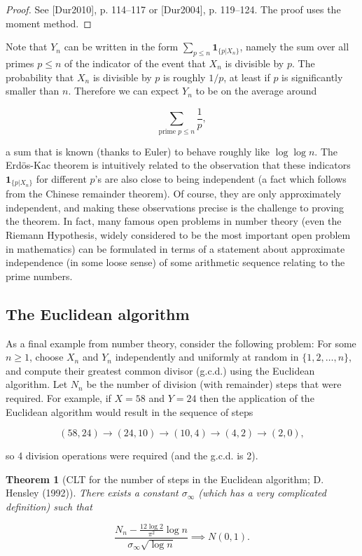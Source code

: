 \documentclass[11pt]{report}
\theoremstyle{plain}
\newtheorem{thm}{Theorem}[chapter]
\theoremstyle{definition}
\begin{document}
\begin{proof}
See [Dur2010], p. 114--117 or [Dur2004], p. 119--124.
The proof uses the moment method.
\end{proof}

\noindent Note that $Y_n$ can be written in the form
$\sum_{p\le n} \mathbf{1}_{\{p | X_n\}}$, namely the
sum over all primes $p\le n$ of the indicator of the
event that $X_n$ is divisible by $p$. The probability
that $X_n$ is divisible by $p$ is roughly $1/p$, at
least if $p$ is significantly smaller than $n$.
Therefore we can expect $Y_n$  to be on the average
around

\[
\sum_{\textrm{prime }p\le n} \frac{1}{p},
\]

\noindent a sum that is known (thanks to Euler) to behave
roughly like $\log\log n$. The Erdös-Kac theorem is
intuitively related to the observation that these
indicators $\mathbf{1}_{\{p | X_n\}}$ for different
$p$'s are also close to being independent (a fact
which follows from the Chinese remainder theorem). Of
course, they are only approximately independent, and
making these observations precise is the challenge to
proving the theorem. In fact, many famous open
problems in number theory (even the Riemann
Hypothesis, widely considered to be the most important
open problem in mathematics) can be formulated in
terms of a statement about approximate independence
(in some loose sense) of some arithmetic sequence
relating to the prime numbers.

\subsection{The Euclidean algorithm}

As a final example from number theory, consider the
following problem: For some $n\ge 1$, choose $X_n$
and $Y_n$ independently and uniformly at random in
$\{1,2,\ldots,n\}$, and compute their greatest common
divisor (g.c.d.) using the Euclidean algorithm. Let
$N_n$ be the number of division (with remainder)
steps that were required. For example, if $X = 58$
and $Y=24$ then the application of the Euclidean
algorithm would result in the sequence of steps

\[
(58,24) \to (24,10) \to (10,4) \to (4,2) \to (2,0),
\]

\noindent so 4 division operations were required (and the
g.c.d. is 2).

\begin{thm}[CLT for the number of steps in the Euclidean algorithm; D. Hensley (1992)]
There exists a constant $\sigma_\infty$ (which has a
very complicated definition) such that

\[
\frac{N_n - \frac{12 \log 2}{\pi^2} \log n}{\sigma_\infty \sqrt{\log n}} \implies N(0,1).
\]

\end{thm}
\end{document}
